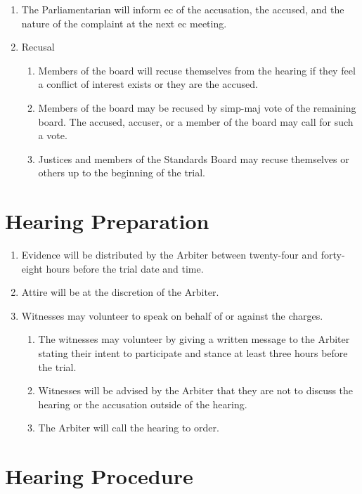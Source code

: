 \begin{enumerate}
		\item The Parliamentarian will inform \gls{ec} of the accusation, the accused, and the nature of the complaint at the next \gls{ec} meeting.

		\item Recusal
			\begin{enumerate}
				\item Members of the board will recuse themselves from the hearing if they feel a conflict of interest exists or they are the accused.
				\item Members of the board may be recused by \gls{simp-maj} vote of the remaining board. The accused, accuser, or a member of the board may call for such a vote.
				\item Justices and members of the Standards Board may recuse themselves or others up to the beginning of the trial.
			\end{enumerate}

	\end{enumerate}

\section{Hearing Preparation}

	\begin{enumerate}
		\item Evidence will be distributed by the Arbiter between twenty-four and forty-eight hours before the trial date and time.
		\item Attire will be at the discretion of the Arbiter.
		\item Witnesses may volunteer to speak on behalf of or against the charges.
			\begin{enumerate}
				\item The witnesses may volunteer by giving a written message to the Arbiter stating their intent to participate and stance at least three hours before the trial.
				\item Witnesses will be advised by the Arbiter that they are not to discuss the hearing or the accusation outside of the hearing.
				\item The Arbiter will call the hearing to order.
			\end{enumerate}

	\end{enumerate}

\section{Hearing Procedure}

